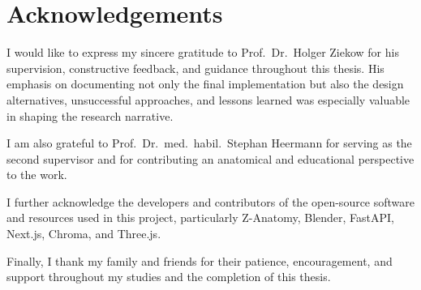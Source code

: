 \chapter*{Acknowledgements}

I would like to express my sincere gratitude to Prof.\ Dr.\ Holger Ziekow for his supervision, constructive feedback, and guidance throughout this thesis. His emphasis on documenting not only the final implementation but also the design alternatives, unsuccessful approaches, and lessons learned was especially valuable in shaping the research narrative.

I am also grateful to Prof.\ Dr.\ med.\ habil.\ Stephan Heermann for serving as the second supervisor and for contributing an anatomical and educational perspective to the work.

I further acknowledge the developers and contributors of the open-source software and resources used in this project, particularly Z-Anatomy, Blender, FastAPI, Next.js, Chroma, and Three.js.

Finally, I thank my family and friends for their patience, encouragement, and support throughout my studies and the completion of this thesis.

\cleardoublepage